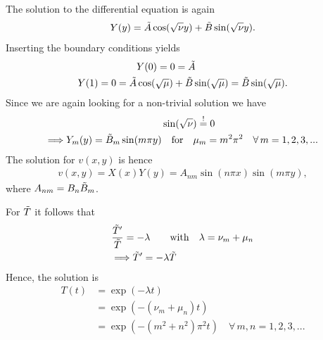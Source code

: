 \documentclass[a4aper,pagesize]{article}
\theoremstyle{definition}
\theoremstyle{plain}
\theoremstyle{remark}
\begin{document}
The solution to the differential equation is again
\begin{align}
    Y(y) = \Tilde{A} \cos(\sqrt{\nu}y) + \Tilde{B}\sin(\sqrt{\nu}y).
\end{align}
Inserting the boundary conditions yields
\begin{align}
    &Y(0) = 0 = \Tilde{A} \\
    Y(1) = 0 = \Tilde{A} &\cos(\sqrt{\mu}) + \Tilde{B}\sin(\sqrt{\mu}) = \Tilde{B}\sin(\sqrt{\mu}).
\end{align}
Since we are again looking for a non-trivial solution we have
\begin{align}
    &\sin(\sqrt{\nu}) \overset{!}{=} 0 \\
    \Longrightarrow Y_m(y) = \Tilde{B}_m \sin(m\pi  y)& \quad {\rm for} \quad \mu_m = m^2\pi^2 \quad \forall \,m = 1, 2, 3, ...
\end{align}
The solution for $v(x,y)$ is hence
\begin{align}
    v(x,y) = X(x)Y(y) = A_{nm} \sin(n\pi  x) \sin(m\pi  y),
\end{align}
where $A_{nm} = B_n \Tilde{B}_m$.

For $\Tilde{T}$ it follows that
\begin{align}
    &\frac{\Tilde{T}'}{\Tilde{T}} = -\lambda \quad \quad {\rm with} \quad \lambda = \nu_m + \mu_n \\
    &\Longrightarrow \Tilde{T}' = -\lambda \Tilde{T}
\end{align}
Hence, the solution is
\begin{align}
    T(t) &= \exp(-\lambda t) \\
    &=\exp(-(\nu_m + \mu_n)t) \\
    &= \exp(-(m^2+ n^2)\pi^2t) \quad \forall \,m,n = 1, 2, 3, ...
\end{align}
\end{document}
